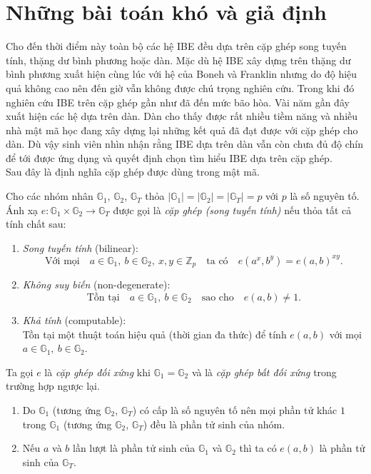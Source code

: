 \documentclass[class=report, crop=false]{standalone}
\begin{document}
	\section{Những bài toán khó và giả định}
		Cho đến thời điểm này toàn bộ các hệ IBE đều dựa trên cặp ghép song tuyến tính, thặng dư bình phương hoặc dàn. Mặc dù hệ IBE xây dựng trên thặng dư bình phương \cite{DBLP:conf/ima/Cocks01} xuất hiện cùng lúc với hệ của Boneh và Franklin \cite{DBLP:conf/crypto/BonehF01} nhưng do độ hiệu quả không cao nên đến giờ vẫn không được chú trọng nghiên cứu. Trong khi đó nghiên cứu IBE trên cặp ghép gần như đã đến mức bão hòa. Vài năm gần đây xuất hiện các hệ dựa trên dàn. Dàn cho thấy được rất nhiều tiềm năng và nhiều nhà mật mã học đang xây dựng lại những kết quả đã đạt được với cặp ghép cho dàn. Dù vậy sinh viên nhìn nhận rằng IBE dựa trên dàn vẫn còn chưa đủ độ chín để tới được ứng dụng và quyết định chọn tìm hiểu IBE dựa trên cặp ghép. \\ \indent
		Sau đây là định nghĩa cặp ghép được dùng trong mật mã.
		\begin{definition}
			Cho các nhóm nhân $\mathbb{G}_1$, $\mathbb{G}_2$, $\mathbb{G}_T$ thỏa $|\mathbb{G}_1| = |\mathbb{G}_2| = |\mathbb{G}_T| = p$ với $p$ là số nguyên tố. Ánh xạ $e: \mathbb{G}_1 \times \mathbb{G}_2 \rightarrow \mathbb{G}_T$ được gọi là \textit{cặp ghép (song tuyến tính)} nếu thỏa tất cả tính chất sau:
			\vspace{-0.5cm}
			\begin{enumerate}[leftmargin=1.5cm, itemindent=-0.5cm]
				\item \textit{Song tuyến tính} (bilinear):
				\[
					\text{Với mọi}\quad a \in \mathbb{G}_1,\ b \in \mathbb{G}_2,\ x, y \in \mathbb{Z}_p \quad \text{ta có} \quad e(a^x, b^y) = e(a, b)^{xy}.
				\]
				\item \textit{Không suy biến} (non-degenerate):
				\[
					\text{Tồn tại}\quad a \in \mathbb{G}_1,\ b \in \mathbb{G}_2 \quad \text{sao cho} \quad e(a, b) \neq 1.
				\]
				\item \textit{Khả tính} (computable): \\
				Tồn tại một thuật toán hiệu quả (thời gian đa thức) để tính $e(a, b)$ với mọi $a \in \mathbb{G}_1,\ b \in \mathbb{G}_2$.
			\end{enumerate} \par
			Ta gọi $e$ là \textit{cặp ghép đối xứng} khi $\mathbb{G}_1 = \mathbb{G}_2$ và là \textit{cặp ghép bất đối xứng} trong trường hợp ngược lại.
		\end{definition}
		\begin{remark}
			\leavevmode \vspace{-\baselineskip}
			\begin{enumerate}[label=(\roman*), leftmargin=1cm]
				\item Do $\mathbb{G}_1$ (tương ứng $\mathbb{G}_2$, $\mathbb{G}_T$) có cấp là số nguyên tố nên mọi phần tử khác $1$ trong $\mathbb{G}_1$ (tương ứng $\mathbb{G}_2$, $\mathbb{G}_T$) đều là phần tử sinh của nhóm.
				\item Nếu $a$ và $b$ lần lượt là phần tử sinh của $\mathbb{G}_1$ và $\mathbb{G}_2$ thì ta có $e(a, b)$ là phần tử sinh của $\mathbb{G}_T$. \label{remark:pairing.2}
			\end{enumerate}
		\end{remark}
\end{document}
